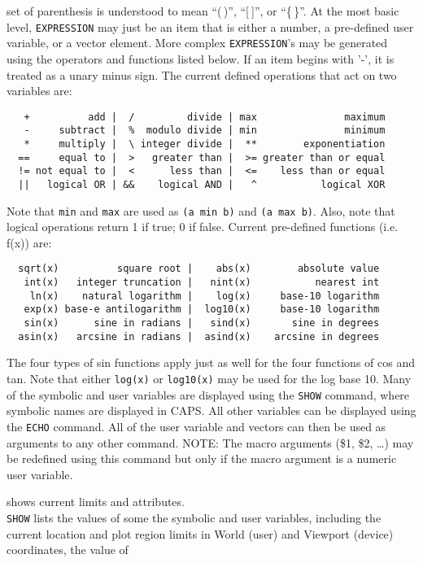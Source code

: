	set of parenthesis is understood to mean ``(\,)'', ``[$\:$]'', or ``\{\,\}''.
	At the most basic level, {\tt EXPRESSION} may just be an
	item that is either a number, a pre-defined user variable, or a
	vector element.  More complex {\tt EXPRESSION}'s may be
	generated using the operators and functions listed below.  If
	an item begins with '-', it is treated as a unary minus sign.
	The current defined operations that act on two variables are:
	\begin{verbatim}
   +          add |  /         divide | max               maximum
   -     subtract |  %  modulo divide | min               minimum
   *     multiply |  \ integer divide |  **        exponentiation
  ==     equal to |  >   greater than |  >= greater than or equal
  != not equal to |  <      less than |  <=    less than or equal
  ||   logical OR | &&    logical AND |   ^           logical XOR
	\end{verbatim}
	Note that {\tt min} and {\tt max} are used as
	{\tt (a min b)} and {\tt (a max b)}.  Also, note
	that logical operations return 1 if true; 0 if false.
	Current pre-defined functions (i.e. f(x)) are:
	\begin{verbatim}
  sqrt(x)          square root |    abs(x)        absolute value
   int(x)   integer truncation |   nint(x)           nearest int
    ln(x)    natural logarithm |    log(x)     base-10 logarithm
   exp(x) base-e antilogarithm |  log10(x)     base-10 logarithm
   sin(x)      sine in radians |   sind(x)       sine in degrees
  asin(x)   arcsine in radians |  asind(x)    arcsine in degrees
	\end{verbatim}
        The four types of sin functions apply just as well for the
	four functions of cos and tan.
	Note that either {\tt log(x)} or {\tt log10(x)}
	may be used for the log base 10.  Many of the symbolic and user
	variables are displayed using the {\tt SHOW}
	command, where symbolic names are displayed in CAPS.  All other
	variables can be displayed using the
	{\tt ECHO} command.  All of the user
	variable and vectors can then be used as arguments to any other
	command.
	NOTE: The macro arguments (\$1, \$2, \dots) may be redefined using
	this command but only if the macro argument is a numeric user variable.
\item [{\tt SHOW [what] } --] shows current limits and attributes.\\
	{\tt SHOW} lists the values of some the symbolic and user
	variables, including the current location and plot region limits
	in World (user) and Viewport (device) coordinates, the value of
